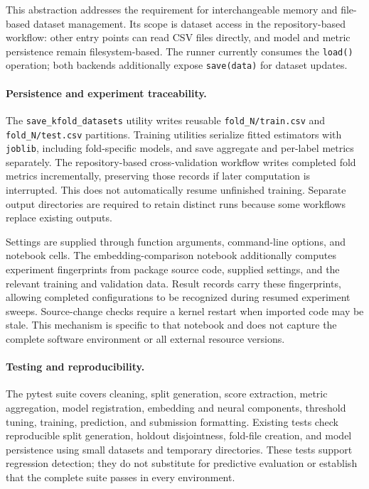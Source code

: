 This abstraction addresses the requirement for interchangeable memory and file-based dataset management. Its scope is dataset access in the repository-based workflow: other entry points can read CSV files directly, and model and metric persistence remain filesystem-based. The runner currently consumes the \texttt{load()} operation; both backends additionally expose \texttt{save(data)} for dataset updates.

\paragraph{Persistence and experiment traceability.}
The \texttt{save\_kfold\_datasets} utility writes reusable \texttt{fold\_N/train.csv} and \texttt{fold\_N/test.csv} partitions. Training utilities serialize fitted estimators with \texttt{joblib}, including fold-specific models, and save aggregate and per-label metrics separately. The repository-based cross-validation workflow writes completed fold metrics incrementally, preserving those records if later computation is interrupted. This does not automatically resume unfinished training. Separate output directories are required to retain distinct runs because some workflows replace existing outputs.

Settings are supplied through function arguments, command-line options, and notebook cells. The embedding-comparison notebook additionally computes experiment fingerprints from package source code, supplied settings, and the relevant training and validation data. Result records carry these fingerprints, allowing completed configurations to be recognized during resumed experiment sweeps. Source-change checks require a kernel restart when imported code may be stale. This mechanism is specific to that notebook and does not capture the complete software environment or all external resource versions.

\paragraph{Testing and reproducibility.}
The pytest suite covers cleaning, split generation, score extraction, metric aggregation, model registration, embedding and neural components, threshold tuning, training, prediction, and submission formatting. Existing tests check reproducible split generation, holdout disjointness, fold-file creation, and model persistence using small datasets and temporary directories. These tests support regression detection; they do not substitute for predictive evaluation or establish that the complete suite passes in every environment.

